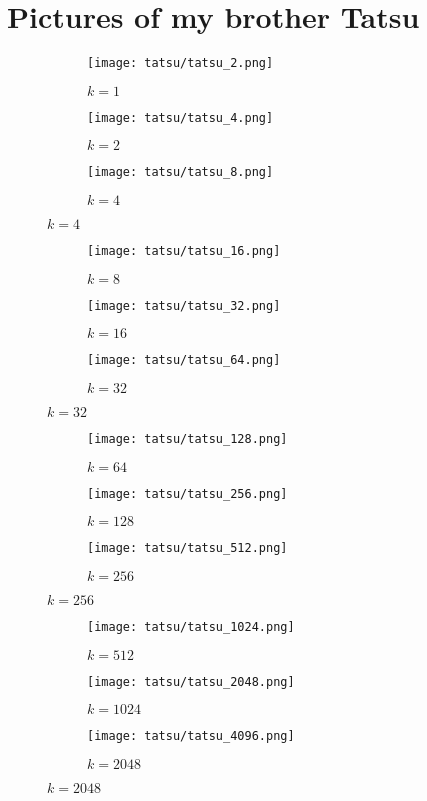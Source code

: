 \documentclass{article}
\begin{document}
\section{Pictures of my brother Tatsu}
\begin{figure}[H]
  \begin{subfigure}{.32\textwidth}
    \centering
    \texttt{[image: tatsu/tatsu\_2.png]}
    \caption{$k=1$}
  \end{subfigure}
  \begin{subfigure}{.32\textwidth}
    \centering
    \texttt{[image: tatsu/tatsu\_4.png]}
    \caption{$k=2$}
  \end{subfigure}
  \begin{subfigure}{.32\textwidth}
    \centering
    \texttt{[image: tatsu/tatsu\_8.png]}
    \caption{$k=4$}
  \end{subfigure}
\end{figure}
\begin{figure}[H]
  \begin{subfigure}{.32\textwidth}
    \centering
    \texttt{[image: tatsu/tatsu\_16.png]}
    \caption{$k=8$}
  \end{subfigure}
  \begin{subfigure}{.32\textwidth}
    \centering
    \texttt{[image: tatsu/tatsu\_32.png]}
    \caption{$k=16$}
  \end{subfigure}
  \begin{subfigure}{.32\textwidth}
    \centering
    \texttt{[image: tatsu/tatsu\_64.png]}
    \caption{$k=32$}
  \end{subfigure}
\end{figure}
\begin{figure}[H]
  \begin{subfigure}{.32\textwidth}
    \centering
    \texttt{[image: tatsu/tatsu\_128.png]}
    \caption{$k=64$}
  \end{subfigure}
  \begin{subfigure}{.32\textwidth}
    \centering
    \texttt{[image: tatsu/tatsu\_256.png]}
    \caption{$k=128$}
  \end{subfigure}
  \begin{subfigure}{.32\textwidth}
    \centering
    \texttt{[image: tatsu/tatsu\_512.png]}
    \caption{$k=256$}
  \end{subfigure}
\end{figure}
\begin{figure}[H]
  \begin{subfigure}{.32\textwidth}
    \centering
    \texttt{[image: tatsu/tatsu\_1024.png]}
    \caption{$k=512$}
  \end{subfigure}
  \begin{subfigure}{.32\textwidth}
    \centering
    \texttt{[image: tatsu/tatsu\_2048.png]}
    \caption{$k=1024$}
  \end{subfigure}
  \begin{subfigure}{.32\textwidth}
    \centering
    \texttt{[image: tatsu/tatsu\_4096.png]}
    \caption{$k=2048$}
  \end{subfigure}
\end{figure}
\end{document}
